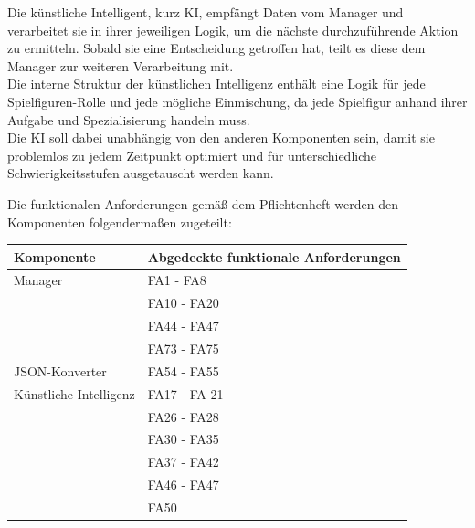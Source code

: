 \begin{description}
	Die künstliche Intelligent, kurz KI, empfängt Daten vom Manager und verarbeitet sie in ihrer jeweiligen Logik, um die nächste durchzuführende Aktion zu ermitteln. Sobald sie eine Entscheidung getroffen hat, teilt es diese dem Manager zur weiteren Verarbeitung mit.\\
	Die interne Struktur der künstlichen Intelligenz enthält eine Logik für jede Spielfiguren-Rolle und jede mögliche Einmischung, da jede Spielfigur anhand ihrer Aufgabe und Spezialisierung handeln muss.\\
	Die KI soll dabei unabhängig von den anderen Komponenten sein, damit sie problemlos zu jedem Zeitpunkt optimiert und für unterschiedliche Schwierigkeitsstufen ausgetauscht werden kann.
\end{description}

Die funktionalen Anforderungen gemäß dem Pflichtenheft werden den Komponenten folgendermaßen zugeteilt:

\begin{tabular}{|l|l|}
	\hline
	\textbf{Komponente} & \textbf{Abgedeckte funktionale Anforderungen}\\\hline
	Manager & FA1 - FA8\\
	& FA10 - FA20\\
	& FA44 - FA47\\
	& FA73 - FA75\\\hline
	JSON-Konverter & FA54 - FA55\\\hline
	Künstliche Intelligenz & FA17 - FA 21\\
	& FA26 - FA28\\
	& FA30 - FA35\\
	& FA37 - FA42\\
	&FA46 - FA47\\
	&FA50\\\hline
	
\end{tabular}
